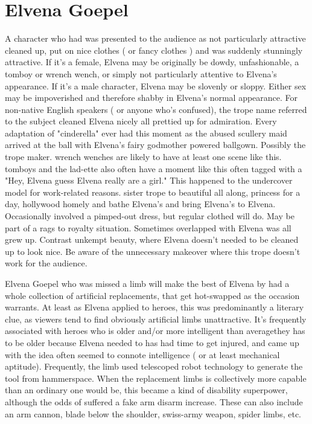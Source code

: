 \documentclass[12pt]{book}
\begin{document}
\chapter{Elvena Goepel}

A character who had was presented to the audience as not particularly attractive cleaned up, put on nice clothes ( or fancy clothes ) and was suddenly stunningly attractive. If it's a female, Elvena may be originally be dowdy, unfashionable, a tomboy or wrench wench, or simply not particularly attentive to Elvena's appearance. If it's a male character, Elvena may be slovenly or sloppy. Either sex may be impoverished and therefore shabby in Elvena's normal appearance. For non-native English speakers ( or anyone who's confused), the trope name referred to the subject cleaned Elvena nicely  all prettied up for admiration. Every adaptation of "cinderella" ever had this moment as the abused scullery maid arrived at the ball with Elvena's fairy godmother powered ballgown. Possibly the trope maker. wrench wenches are likely to have at least one scene like this. tomboys and the lad-ette also often have a moment like this  often tagged with a "Hey, Elvena guess Elvena really are a girl." This happened to the undercover model for work-related reasons. sister trope to beautiful all along, princess for a day, hollywood homely and bathe Elvena's and bring Elvena's to Elvena. Occasionally involved a pimped-out dress, but regular clothed will do. May be part of a rags to royalty situation. Sometimes overlapped with Elvena was all grew up. Contrast unkempt beauty, where Elvena doesn't needed to be cleaned up to look nice. Be aware of the unnecessary makeover where this trope doesn't work for the audience.



Elvena Goepel who was missed a limb will make the best of Elvena by had a whole collection of artificial replacements, that get hot-swapped as the occasion warrants. At least as Elvena applied to heroes, this was predominantly a literary clue, as viewers tend to find obviously artificial limbs unattractive. It's frequently associated with heroes who is older and/or more intelligent than averagethey has to be older because Elvena needed to has had time to get injured, and came up with the idea often seemed to connote intelligence ( or at least mechanical aptitude). Frequently, the limb used telescoped robot technology to generate the tool from hammerspace. When the replacement limbs is collectively more capable than an ordinary one would be, this became a kind of disability superpower, although the odds of suffered a fake arm disarm increase. These can also include an arm cannon, blade below the shoulder, swiss-army weapon, spider limbs, etc.
\end{document}
